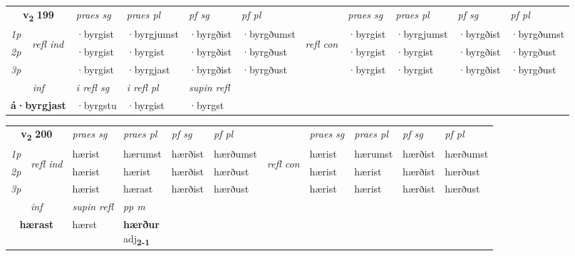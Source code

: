 \noindent
\begin{tabular}{lllllllllll} \toprule
\multicolumn{2}{c}{\textbf{v{\textsubscript{2}}} \Large{\textbf{199}}}  &  \textit{praes sg}  & \textit{praes pl}  &\textit{ pf sg} & \textit{pf pl} &  &  \textit{praes sg}  & \textit{praes pl}  & \textit{pf sg} & \textit{pf pl } \\*
	\cmidrule{3-6} \cmidrule{8-11}
 {\textit{1p}} & \multirow{3}{*}{\begin{turn}{90}\textit{refl ind}\end{turn}}  & ·byrgist & ·byrgjumst & ·byrgðist & ·byrgðumst & \multirow{3}{*}{\begin{turn}{90}\textit{refl con}\end{turn}}  &·byrgist & ·byrgjumst & ·byrgðist & ·byrgðumst \\*
 {\textit{2p}} &  & ·byrgist & ·byrgist & ·byrgðist & ·byrgðust & &·byrgist & ·byrgist & ·byrgðist & ·byrgðust \\*
 {\textit{3p}}  & & ·byrgist & ·byrgjast & ·byrgðist & ·byrgðust & & ·byrgist & ·byrgist& ·byrgðist & ·byrgðust \\*
\cmidrule{3-6} \cmidrule{8-11}

   \multicolumn{2}{c}{\textit{inf}}   & \textit{i refl sg} & \textit{i refl pl}   & \textit{supin refl}  \\*
  \multicolumn{2}{c}{\textbf{á\allowbreak ·byrgjast}}    & ·byrgstu & ·byrgist   & ·byrgst  \\*
\end{tabular}

\noindent
\begin{tabular}{lllllllllll} \toprule
\multicolumn{2}{c}{\textbf{v{\textsubscript{2}}} \Large{\textbf{200}}}  &  \textit{praes sg}  & \textit{praes pl}  &\textit{ pf sg} & \textit{pf pl} &  &  \textit{praes sg}  & \textit{praes pl}  & \textit{pf sg} & \textit{pf pl } \\*
	\cmidrule{3-6} \cmidrule{8-11}
 {\textit{1p}} & \multirow{3}{*}{\begin{turn}{90}\textit{refl ind}\end{turn}}  & hærist & hærumst & hærðist & hærðumst & \multirow{3}{*}{\begin{turn}{90}\textit{refl con}\end{turn}}  &hærist & hærumst & hærðist & hærðumst \\*
 {\textit{2p}} &  & hærist & hærist & hærðist & hærðust & &hærist & hærist & hærðist & hærðust \\*
 {\textit{3p}}  & & hærist & hærast & hærðist & hærðust & & hærist & hærist& hærðist & hærðust \\*
\cmidrule{3-6} \cmidrule{8-11}

   \multicolumn{2}{c}{\textit{inf}}       & \textit{supin refl} & \textit{pp m} \\*
  \multicolumn{2}{c}{\textbf{hærast}}        & hærst & \specialcell{\textbf{hærður} \\ adj\textbf{\textsubscript{2-1}}} \\*
\end{tabular}


